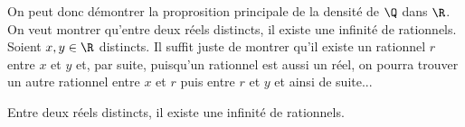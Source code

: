 On peut donc démontrer la proprosition principale de la densité de $\Q$ dans $\R$. 
On veut montrer qu'entre deux réels distincts, il existe une infinité de rationnels. 
Soient $x, y \in \R$ distincts. Il suffit juste de montrer qu'il existe un rationnel $r$ entre $x$ et $y$ et, par suite, 
puisqu'un rationnel est aussi un réel, on pourra trouver un autre rationnel entre $x$ et $r$ puis entre $r$ et $y$ et 
ainsi de suite... 

\begin{proposition}[Densité]
    Entre deux réels distincts, il existe une infinité de rationnels. 
\end{proposition}






